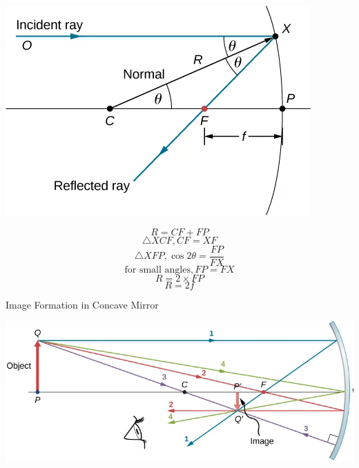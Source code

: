 \documentclass{beamer}
\begin{document}
\begin{frame}
	\begin{center}
		\includegraphics[scale=0.3]{50.png}
	\end{center}
	$$ R = CF + FP $$
	$$ \triangle XCF, CF = XF $$
	$$ \triangle XFP, \cos 2\theta = \frac{FP}{FX} $$
	$$ \text{for small angles}, FP = FX $$
	$$ R = 2 \times FP $$
	$$ R = 2f$$
\end{frame}

\begin{frame}{Image Formation in Concave Mirror}
	\begin{center}
		\includegraphics[scale=0.4]{49.png}
	\end{center}
\end{frame}
\end{document}
